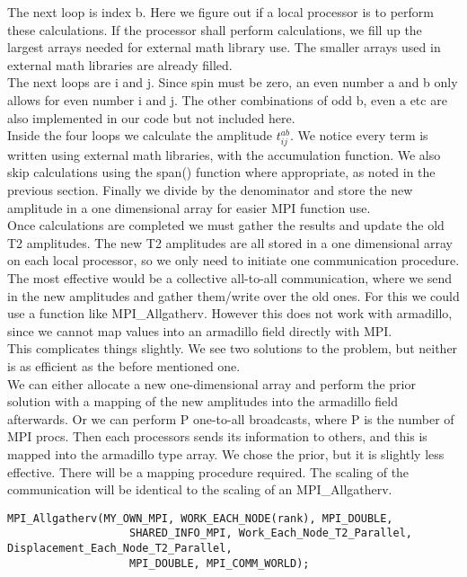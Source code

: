 The next loop is index b. Here we figure out if a local processor is to perform these calculations. If the processor shall perform calculations, we fill up the largest arrays needed for external math library use. The smaller arrays used in external math libraries are already filled. \\

The next loops are i and j. Since spin must be zero, an even number a and b only allows for even number i and j. The other combinations of odd b, even a etc are also implemented in our code but not included here. \\

Inside the four loops we calculate the amplitude $t_{ij}^{ab}$. We notice every term is written using external math libraries, with the accumulation function. We also skip calculations using the span() function where appropriate, as noted in the previous section. Finally we divide by the denominator and store the new amplitude in a one dimensional array for easier MPI function use. \\

Once calculations are completed we must gather the results and update the old T2 amplitudes. The new T2 amplitudes are all stored in a one dimensional array on each local processor, so we only need to initiate one communication procedure. The most effective would be a collective all-to-all communication, where we send in the new amplitudes and gather them/write over the old ones. For this we could use a function like MPI\_Allgatherv. However this does not work with armadillo, since we cannot map values into an armadillo field directly with MPI. \\

This complicates things slightly. We see two solutions to the problem, but neither is as efficient as the before mentioned one. \\

We can either allocate a new one-dimensional array and perform the prior solution with a mapping of the new amplitudes into the armadillo field afterwards. Or we can perform P one-to-all broadcasts, where P is the number of MPI procs. Then each processors sends its information to others, and this is mapped into the armadillo type array. We chose the prior, but it is slightly less effective. There will be a mapping procedure required. The scaling of the communication will be identical to the scaling of an MPI\_Allgatherv.

\begin{lstlisting}
MPI_Allgatherv(MY_OWN_MPI, WORK_EACH_NODE(rank), MPI_DOUBLE,
                   SHARED_INFO_MPI, Work_Each_Node_T2_Parallel, Displacement_Each_Node_T2_Parallel,
                   MPI_DOUBLE, MPI_COMM_WORLD);
\end{lstlisting}

